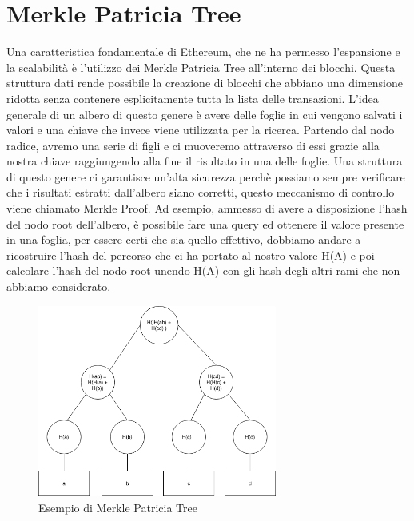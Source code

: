 \documentclass[12pt]{report}
\begin{document}
\section{Merkle Patricia Tree}

Una caratteristica fondamentale di Ethereum, che ne ha permesso l'espansione e la scalabilità è l'utilizzo dei Merkle Patricia Tree all'interno dei blocchi. 
Questa struttura dati rende possibile la creazione di blocchi che abbiano una dimensione ridotta senza contenere esplicitamente tutta la lista delle transazioni.
L'idea generale di un albero di questo genere è avere delle foglie in cui vengono salvati i valori e una chiave che invece viene utilizzata per la ricerca. Partendo dal nodo radice, avremo una serie di figli e ci muoveremo attraverso di essi grazie alla nostra chiave raggiungendo alla fine il risultato in una delle foglie.
Una struttura di questo genere ci garantisce un'alta sicurezza perchè possiamo sempre verificare che i risultati estratti dall'albero siano corretti, questo meccanismo di controllo viene chiamato Merkle Proof.
Ad esempio, ammesso di avere a disposizione l'hash del nodo root dell'albero, è possibile fare una query ed ottenere il valore presente in una foglia, per essere certi che sia quello effettivo, dobbiamo andare a ricostruire l'hash del percorso che ci ha portato al nostro valore H(A) e poi calcolare l'hash del nodo root unendo H(A) con gli hash degli altri rami che non abbiamo considerato.

\begin{figure}[H]
    \centering\includegraphics[width=0.7\textwidth]{radixTree}
    \caption{Esempio di Merkle Patricia Tree}
\end{figure}
\end{document}
